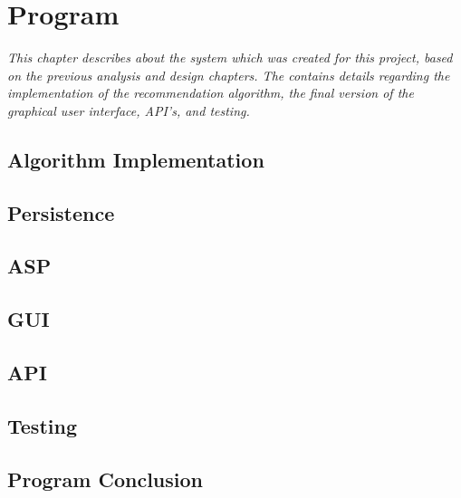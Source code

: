 \chapter{Program}

\textit{This chapter describes about the system which was created for this project, based on the previous analysis and design chapters. The contains details regarding the implementation of the recommendation algorithm, the final version of the graphical user interface, API's, and testing.}

\section{Algorithm Implementation}
\label{AlgorithmProg}

\section{Persistence}
\label{Persistence}

\section{ASP}
\label{ASP}

\section{GUI}
\label{GUI}

\section{API}
\label{API}

\section{Testing}
\label{Testing}

\section{Program Conclusion}
\label{ProCon}

